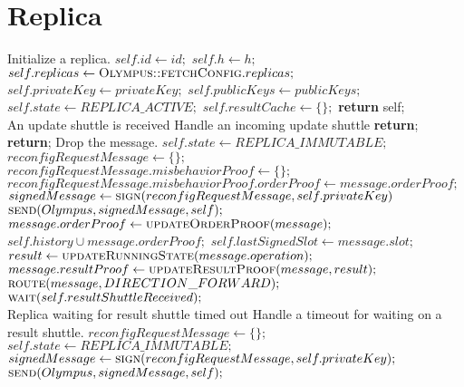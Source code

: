 \section{Replica}
\begin{algorithmic}[1]
 \Comment Initialize a replica.
    \State $self.id\gets id;$
    \State $self.h\gets h;$
    \State $self.replicas\gets \Call{Olympus::fetchConfig}{}.replicas;$
    \State $self.privateKey\gets privateKey;$
    \State $self.publicKeys\gets publicKeys;$
    \State $self.state\gets REPLICA\_ACTIVE;$
    \State $self.resultCache\gets \{\};$
    \State \textbf{return} self;
\EndFunction
\\
\Require An update shuttle is received
 \Comment Handle an incoming update shuttle
    	\State \textbf{return};
    \EndIf
        \State \textbf{return}; \Comment Drop the message.
    \EndIf
    	\State $self.state\gets REPLICA\_IMMUTABLE;$
      \State $reconfigRequestMessage\gets \{\};$
      \State $reconfigRequestMessage.misbehaviorProof\gets \{\};$
      \State $reconfigRequestMessage.misbehaviorProof.orderProof\gets message.orderProof;$
      \State $signedMessage\gets \Call{sign}{reconfigRequestMessage, self.privateKey}$
      \State $\Call {send}{Olympus, signedMessage, self};$  	
    \Else
    	\State $message.orderProof\gets \Call{updateOrderProof}{message};$
        \State $self.history \cup message.orderProof;$
        \State $self.lastSignedSlot\gets message.slot;$
        \State $result\gets \Call{updateRunningState}{message.operation};$ 
        \State $message.resultProof\gets \Call{updateResultProof}{message, result};$
        \State $\Call{route}{message, DIRECTION\_FORWARD};$
        \State $\Call{wait}{self.resultShuttleReceived};$
    \EndIf
\EndFunction
\\

\Require Replica waiting for result shuttle timed out
 \Comment Handle a timeout for waiting on a result shuttle.
	\State $reconfigRequestMessage\gets \{\};$
    \State $self.state\gets REPLICA\_IMMUTABLE;$
    \State $signedMessage\gets \Call{sign}{reconfigRequestMessage, self.privateKey};$
    \State $\Call {send}{Olympus, signedMessage, self};$
\EndFunction
\\


\end{algorithmic}
